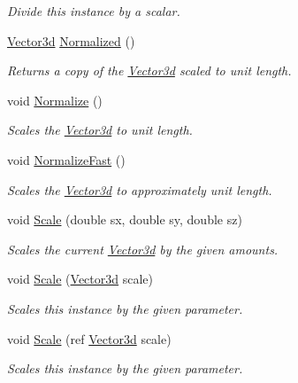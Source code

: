 \begin{DoxyCompactItemize}
\begin{DoxyCompactList}\small\item\em Divide this instance by a scalar.\end{DoxyCompactList}\item 
\hyperlink{struct_open_t_k_1_1_vector3d}{Vector3d} \hyperlink{struct_open_t_k_1_1_vector3d_a4143dc72cf7c9850c1225a7c4ab65963}{Normalized} ()
\begin{DoxyCompactList}\small\item\em Returns a copy of the \hyperlink{struct_open_t_k_1_1_vector3d}{Vector3d} scaled to unit length. \end{DoxyCompactList}\item 
void \hyperlink{struct_open_t_k_1_1_vector3d_a5096b75ce9daa19ffca7db45feb85415}{Normalize} ()
\begin{DoxyCompactList}\small\item\em Scales the \hyperlink{struct_open_t_k_1_1_vector3d}{Vector3d} to unit length. \end{DoxyCompactList}\item 
void \hyperlink{struct_open_t_k_1_1_vector3d_a44b3f4f59aa64e1dfefdc2f714de544b}{Normalize\-Fast} ()
\begin{DoxyCompactList}\small\item\em Scales the \hyperlink{struct_open_t_k_1_1_vector3d}{Vector3d} to approximately unit length. \end{DoxyCompactList}\item 
void \hyperlink{struct_open_t_k_1_1_vector3d_a36c3fa94dd653353e08eb0ff1bf10ce0}{Scale} (double sx, double sy, double sz)
\begin{DoxyCompactList}\small\item\em Scales the current \hyperlink{struct_open_t_k_1_1_vector3d}{Vector3d} by the given amounts. \end{DoxyCompactList}\item 
void \hyperlink{struct_open_t_k_1_1_vector3d_a6bfb88dfaa9794d8caf747019c085dfb}{Scale} (\hyperlink{struct_open_t_k_1_1_vector3d}{Vector3d} scale)
\begin{DoxyCompactList}\small\item\em Scales this instance by the given parameter.\end{DoxyCompactList}\item 
void \hyperlink{struct_open_t_k_1_1_vector3d_a250b4e8eb8b4ca8d2b1bf67fb27d7568}{Scale} (ref \hyperlink{struct_open_t_k_1_1_vector3d}{Vector3d} scale)
\begin{DoxyCompactList}\small\item\em Scales this instance by the given parameter.\end{DoxyCompactList}\item 

\end{DoxyCompactItemize}
